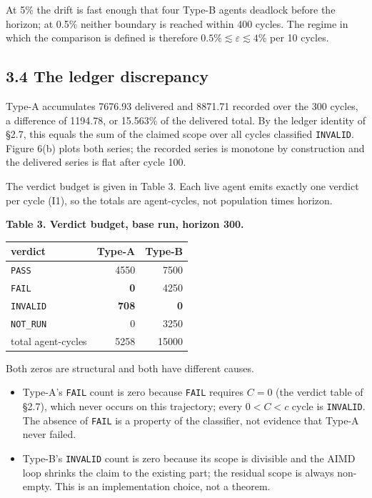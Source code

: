 \documentclass[11pt,a4paper]{article}
\providecommand{\tightlist}{\setlength{\itemsep}{0pt}\setlength{\parskip}{0pt}}
\newcounter{none}
\begin{document}
At 5\% the drift is fast enough that four Type-B agents deadlock before the
horizon; at 0.5\% neither boundary is reached within 400 cycles. The regime in
which the comparison is defined is therefore \(0.5\%\lesssim\varepsilon\lesssim
4\%\) per 10 cycles.

\subsection{3.4 The ledger discrepancy}\label{the-ledger-discrepancy}

Type-A accumulates 7676.93 delivered and 8871.71 recorded over the 300 cycles, a
difference of 1194.78, or 15.563\% of the delivered total. By the ledger identity
of §2.7, this equals the sum of the claimed scope over all cycles classified
\texttt{INVALID}. Figure 6(b) plots both series; the recorded series is monotone by
construction and the delivered series is flat after cycle 100.

The verdict budget is given in Table 3. Each live agent emits exactly one verdict
per cycle (I1), so the totals are agent-cycles, not population times horizon.

\textbf{Table 3. Verdict budget, base run, horizon 300.}

{\def\LTcaptype{none} %
\begin{longtable}[]{@{}lrr@{}}
\toprule\noalign{}
verdict & Type-A & Type-B \\
\midrule\noalign{}
\endhead
\bottomrule\noalign{}
\endlastfoot
\texttt{PASS} & 4550 & 7500 \\
\texttt{FAIL} & \textbf{0} & 4250 \\
\texttt{INVALID} & \textbf{708} & \textbf{0} \\
\texttt{NOT\_RUN} & 0 & 3250 \\
total agent-cycles & 5258 & 15000 \\
\end{longtable}
}

Both zeros are structural and both have different causes.

\begin{itemize}
\tightlist
\item
  Type-A's \texttt{FAIL} count is zero because \texttt{FAIL} requires \(C=0\) (the verdict table
  of §2.7), which never occurs on this trajectory; every \(0<C<c\) cycle is \texttt{INVALID}. The absence of
  \texttt{FAIL} is a property of the classifier, not evidence that Type-A never failed.
\item
  Type-B's \texttt{INVALID} count is zero because its scope is divisible and the AIMD
  loop shrinks the claim to the existing part; the residual scope is always
  non-empty. This is an implementation choice, not a theorem.
\end{itemize}
\end{document}
